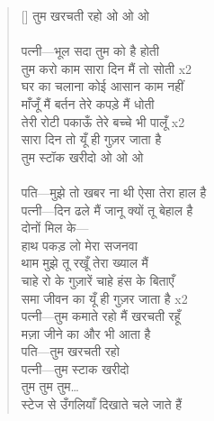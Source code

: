\begin{verse}[\versewidth]
{तुम खरचती रहो ओ ओ ओ\\
\\
पत्नी—भूल सदा तुम को है होती\\
तुम करो काम सारा दिन मैं तो सोती x2\\
घर का चलाना कोई आसान काम नहीं\\
माँजूँ मैं बर्तन तेरे कपड़े मैं धोती\\
तेरी रोटी पकाऊँ तेरे बच्चे भी पालूँ x2\\
सारा दिन तो यूँ ही गुज़र जाता है\\
तुम स्टॉक खरीदो ओ ओ ओ\\
\\
पति—मुझे तो खबर ना थी ऐसा तेरा हाल है\\
पत्नी—दिन ढले मैं जानू क्यों तू बेहाल है\\
दोनों मिल के—\\
हाथ पकड़ लो मेरा सजनवा\\
थाम मुझे तू रखूँ तेरा ख्याल मैं\\
चाहे रो के गुज़ारें चाहे हंस के बिताएँ\\
समा जीवन का यूँ ही गुज़र जाता है
}x\texthindi{2\\
पत्नी—तुम कमाते रहो मैं खरचती रहूँ\\
मज़ा जीने का और भी आता है\\
पति—तुम खरचती रहो\\
पत्नी—तुम स्टाक खरीदो\\
तुम तुम तुम…\\
स्टेज से उँगलियाँ दिखाते चले जाते हैं
}\end{verse}

